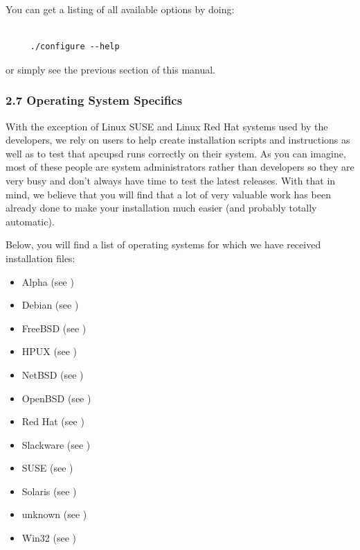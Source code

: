 You can get a listing of all available options by doing: 

\footnotesize
\begin{verbatim}
     
     ./configure --help
\end{verbatim}
\normalsize

or simply see the previous section of this manual. 

\label{Operating-System-Specifics}

\subsubsection*{2.7 Operating System Specifics}

\label{index-OSes-31}
With the exception of Linux SUSE and Linux Red Hat systems used by the
developers, we rely on users to help create installation scripts and
instructions as well as to test that apcupsd runs correctly on their system.
As you can imagine, most of these people are system administrators rather than
developers so they are very busy and don't always have time to test the latest
releases.  With that in mind, we believe that you will find that a lot of very
valuable work has been already done to make your installation much easier (and
probably totally automatic).  

Below, you will find a list of operating systems for which we have received
installation files:  

\begin{itemize}
\item Alpha (see 
)  
\item Debian (see 
)  
\item FreeBSD (see 
)  
\item HPUX (see 
)  
\item NetBSD (see 
)  
\item OpenBSD (see 
)  
\item Red Hat (see 
)  
\item Slackware (see 
)  
\item SUSE (see 
)  
\item Solaris (see 
)  
\item unknown (see 
)  
\item Win32 (see 
) 
\end{itemize}

